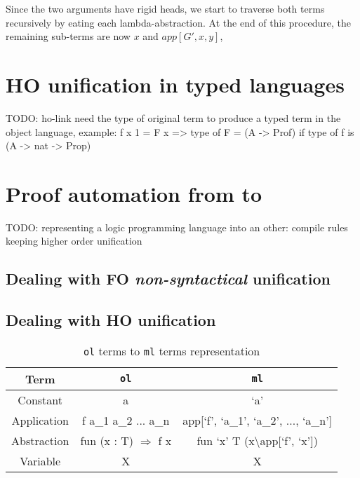 \documentclass[sigconf,natbib=false]{acmart}
\def\elpi{\proglang{elpi}}
\def\coq{\proglang{coq}}
\newcommand*{\acronym}[1]{\texttt{#1}\xspace}
\def\ol{\acronym{ol}} %
\def\ml{\acronym{ml}} %
\begin{document}
Since the two arguments have rigid heads, we start to traverse both terms
recursively by eating each lambda-abstraction. At the end of this procedure, the
remaining sub-terms are  now $x$ and $app[G', x, y]$, 

\section{HO unification in typed languages}

TODO: ho-link need the type of original term to produce a typed term in the
object language, example: f x 1 = F x => type of F = (A -> Prof) if type of f is 
(A -> nat -> Prop)

\section{Proof automation from \coq to \elpi}

TODO: representing a logic programming language into an other: compile rules
keeping higher order unification

\subsection{Dealing with FO \textit{non-syntactical} unification}

\subsection{Dealing with HO unification}


\appendix

\begin{table}
  \centering
  \begin{tabular}{c||c|c}
  Term        & \ol                    & \ml                                   \\
  \hline\hline
  Constant    & a                             & `a'                                     \\
  Application & f a\_1 a\_2 ... a\_n          & app{[}`f', `a\_1', `a\_2', ..., `a\_n'{]}     \\
  Abstraction & fun (x : T) $\Rightarrow$ f x & fun `x' T (x\textbackslash app{[}`f', `x'{]}) \\
  Variable    & X                             & X                                             \\
  \end{tabular}
  \caption{\ol terms to \ml terms representation}
  \label{table:coq2elpi}
\end{table}
\end{document}

